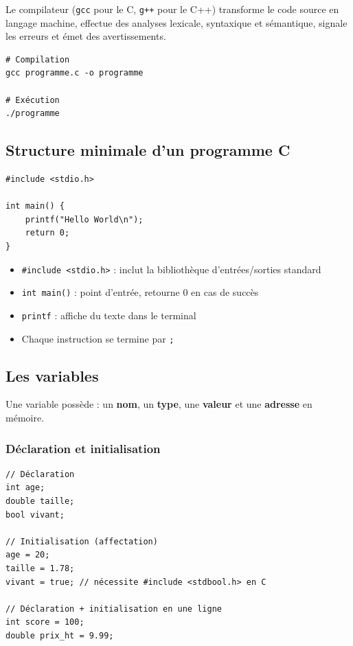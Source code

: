 \documentclass[12pt,a4paper]{article}
\begin{document}
Le compilateur (\texttt{gcc} pour le C, \texttt{g++} pour le C++) transforme le code source en langage machine, effectue des analyses lexicale, syntaxique et sémantique, signale les erreurs et émet des avertissements.

\begin{lstlisting}[style=bash, caption={Compilation et exécution d'un programme C}]
# Compilation
gcc programme.c -o programme

# Exécution
./programme
\end{lstlisting}

\subsection{Structure minimale d'un programme C}

\begin{lstlisting}[caption={Hello World en C}]
#include <stdio.h>

int main() {
    printf("Hello World\n");
    return 0;
}
\end{lstlisting}

\begin{itemize}
    \item \texttt{\#include <stdio.h>} : inclut la bibliothèque d'entrées/sorties standard
    \item \texttt{int main()} : point d'entrée, retourne 0 en cas de succès
    \item \texttt{printf} : affiche du texte dans le terminal
    \item Chaque instruction se termine par \texttt{;}
\end{itemize}

\subsection{Les variables}

Une variable possède : un \textbf{nom}, un \textbf{type}, une \textbf{valeur} et une \textbf{adresse} en mémoire.

\subsubsection{Déclaration et initialisation}

\begin{lstlisting}[caption={Déclaration et initialisation de variables}]
// Déclaration
int age;
double taille;
bool vivant;

// Initialisation (affectation)
age = 20;
taille = 1.78;
vivant = true; // nécessite #include <stdbool.h> en C

// Déclaration + initialisation en une ligne
int score = 100;
double prix_ht = 9.99;
\end{lstlisting}
\end{document}
